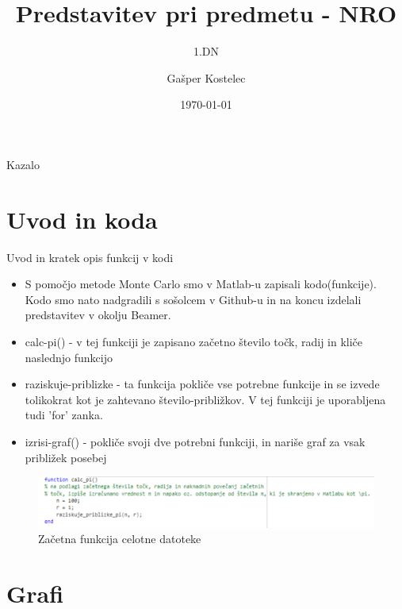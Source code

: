 \documentclass{beamer}
\title{Predstavitev pri predmetu - NRO}
\subtitle{1.DN}
\author{Gašper Kostelec}
\institute[] { 
Univerza v Ljubljani \\
Fakulteta za strojništvo \\
RRP, 3.letnik \\}
\date{\today}
\begin{document}
\begin{frame}
    \titlepage
\end{frame}

\begin{frame}{Kazalo}
    \tableofcontents
\end{frame}




\section{Uvod in koda}

\begin{frame}{Uvod in kratek opis funkcij v kodi}
\begin{itemize}
    \item S pomočjo metode Monte Carlo smo v Matlab-u zapisali kodo(funkcije). Kodo smo nato nadgradili s sošolcem v Github-u in na koncu izdelali predstavitev v okolju Beamer.
\pause
    \item calc-pi() - v tej funkciji je zapisano začetno število točk, radij in kliče naslednjo funkcijo
\pause
    \item raziskuje-priblizke - ta funkcija pokliče vse potrebne funkcije in se izvede tolikokrat kot je zahtevano število-približkov. V tej funkciji je uporabljena tudi 'for' zanka.
\pause
    \item izrisi-graf() - pokliče svoji dve potrebni funkciji, in nariše graf za vsak približek posebej
\end{itemize}
\begin{figure}
\includegraphics[scale=0.8]{začetek zapisa kode.png}
\caption{Začetna funkcija celotne datoteke}
\end{figure}
\end{frame}


\section{Grafi}
\end{document}
